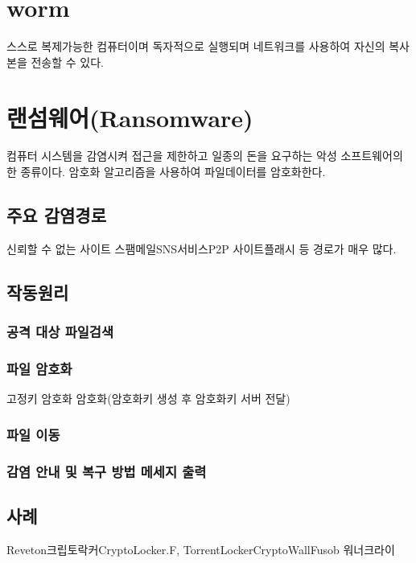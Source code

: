 \documentclass{oblivoir}
\begin{document}
\section{worm}
스스로 복제가능한 컴퓨터이며 독자적으로 실행되며 네트워크를 사용하여 자신의 복사본을 전송할 수 있다. 

\section{랜섬웨어(Ransomware)}
컴퓨터 시스템을 감염시켜 접근을 제한하고 일종의 돈을 요구하는 악성 소프트웨어의 한 종류이다. 암호화 알고리즘을 사용하여 파일데이터를 암호화한다.

\subsection{주요 감염경로}
신뢰할 수 없는 사이트\newline
스팸메일\newline SNS서비스\newline P2P 사이트 플래시 등 경로가 매우 많다.

\subsection{작동원리}
\subsubsection{공격 대상 파일검색}
\subsubsection{파일 암호화}
고정키 암호화  암호화(암호화키 생성 후 암호화키 서버 전달)
\subsubsection{파일 이동}
\subsubsection{감염 안내 및 복구 방법 메세지 출력}

\subsection{사례}
Reveton\newline 크립토락커\newline CryptoLocker.F, TorrentLocker\newline CryptoWall\newline Fusob
워너크라이
\end{document}
